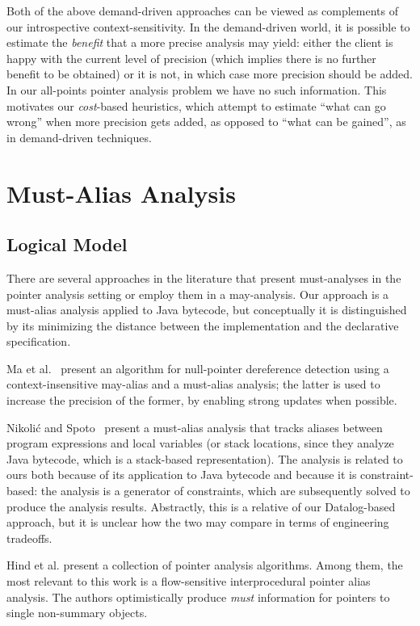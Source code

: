Both of the above demand-driven approaches can be viewed as complements of our introspective context-sensitivity. In the demand-driven world, it is possible to estimate the \emph{benefit} that a more precise analysis may yield: either the client is happy with the current level of precision (which implies there is no further benefit to be obtained) or it is not, in which case more precision should be added. In our all-points pointer analysis problem we have no such information. This motivates our \emph{cost}-based heuristics, which attempt to estimate ``what can go wrong'' when more precision gets added, as opposed to ``what can be gained'', as in demand-driven techniques.



\section{Must-Alias Analysis}

\subsection*{Logical Model}

There are several approaches in the literature that present must-analyses in the pointer analysis setting or employ them in a may-analysis. Our approach is a must-alias analysis applied to Java bytecode, but conceptually it is distinguished by its minimizing the distance between the implementation and the declarative specification.

Ma et al.~\cite{isola:2008:Ma} present an algorithm for null-pointer dereference detection using a context-insensitive may-alias and a must-alias analysis; the latter is used to increase the precision of the former, by enabling strong updates when possible.

Nikoli\'{c} and Spoto~\cite{ictac:2012:Nikolic} present a must-alias analysis that tracks aliases between program expressions and local variables (or stack locations, since they analyze Java bytecode, which is a stack-based representation). The analysis is related to ours both because of its application to Java bytecode and because it is constraint-based: the analysis is a generator of constraints, which are subsequently solved to produce the analysis results. Abstractly, this is a relative of our Datalog-based approach, but it is unclear how the two may compare in terms of engineering tradeoffs.

Hind et al. \cite{article:1999:Hind} present a collection of pointer analysis algorithms. Among them, the most relevant to this work is a flow-sensitive interprocedural pointer alias analysis. The authors optimistically produce \emph{must} information for pointers to single non-summary objects.

